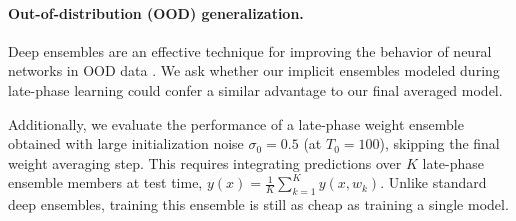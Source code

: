 \documentclass{article} \usepackage{iclr2021_conference,times}
\begin{document}
\paragraph{Out-of-distribution (OOD) generalization.} Deep ensembles are an effective technique for improving the behavior of neural networks in OOD data \citep{lakshminarayanan_simple_2017}. We ask whether our implicit ensembles modeled during late-phase learning could confer a similar advantage to our final averaged model.

Additionally, we evaluate the performance of a late-phase weight ensemble obtained with large initialization noise $\sigma_0 = 0.5$ (at $T_0 = 100$), skipping the final weight averaging step. This requires integrating predictions over $K$ late-phase ensemble members at test time, $y(x) = \frac{1}{K} \sum_{k=1}^K y(x, w_k)$. Unlike standard deep ensembles, training this ensemble is still as cheap as training a single model.
\end{document}
